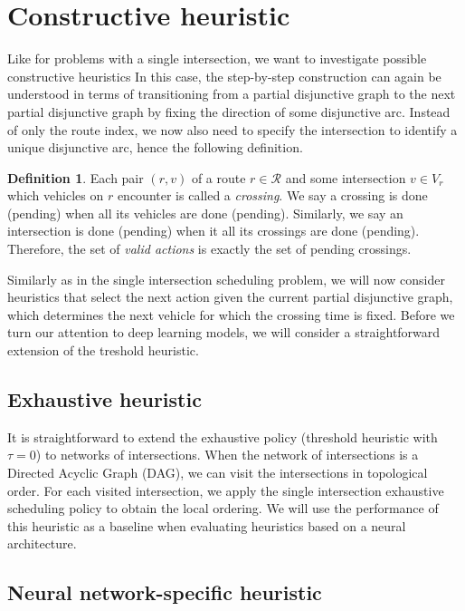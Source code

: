 \documentclass[a4paper]{article}
\theoremstyle{definition}
\newtheorem{define}{Definition}[section]
\theoremstyle{plain}
\begin{document}
\section{Constructive heuristic}

Like for problems with a single intersection, we want to investigate possible
constructive heuristics In this case, the step-by-step construction can again be
understood in terms of transitioning from a partial disjunctive graph to the
next partial disjunctive graph by fixing the direction of some disjunctive arc.
Instead of only the route index, we now also need to specify the intersection to
identify a unique disjunctive arc, hence the following definition.

\begin{define}
  Each pair $(r, v)$ of a route $r \in \mathcal{R}$ and some intersection
  $v \in V_{r}$ which vehicles on $r$ encounter is called a \textit{crossing}.
  We say a crossing is done (pending) when all its vehicles are done (pending).
  Similarly, we say an intersection is done (pending) when it all its crossings
  are done (pending). Therefore, the set of \textit{valid actions} is exactly
  the set of pending crossings.
\end{define}

Similarly as in the single intersection scheduling problem, we will now consider
heuristics that select the next action given the current partial disjunctive
graph, which determines the next vehicle for which the crossing time is fixed.
Before we turn our attention to deep learning models, we will consider a
straightforward extension of the treshold heuristic.

\subsection{Exhaustive heuristic}

It is straightforward to extend the exhaustive policy (threshold heuristic with
$\tau = 0$) to networks of intersections. When the network of intersections is a
Directed Acyclic Graph (DAG), we can visit the intersections in topological
order. For each visited intersection, we apply the single intersection
exhaustive scheduling policy to obtain the local ordering.
%
We will use the performance of this heuristic as a baseline when evaluating
heuristics based on a neural architecture.

\subsection{Neural network-specific heuristic}
\end{document}
